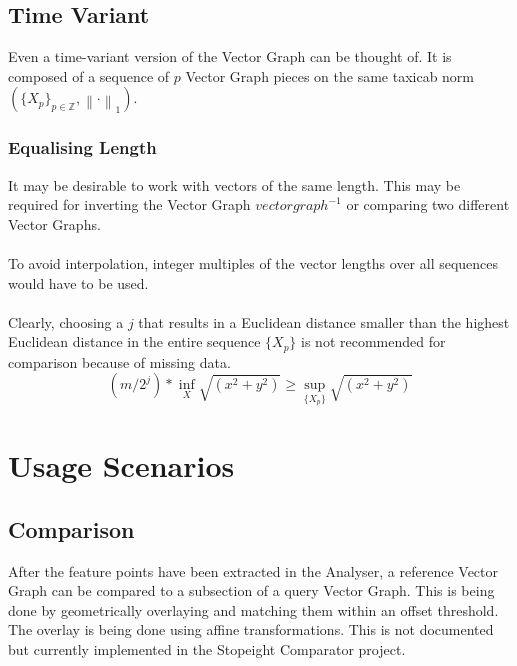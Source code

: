 \documentclass{report}
\newcommand\norm[1]{\left\lVert#1\right\rVert}
\begin{document}
\section{Time Variant}
Even a time-variant version of the Vector Graph can be thought of. It is composed of a sequence of $p$ Vector Graph pieces on the same taxicab norm $(\{X_{p}\}_{p\in \mathbb{Z}},\norm{\cdot}_1)$.
\subsection{Equalising Length}
It may be desirable to work with vectors of the same length. This may be required for inverting the Vector Graph $vectorgraph^{-1}$ or comparing two different Vector Graphs.\\\\
To avoid interpolation, integer multiples of the vector lengths over all sequences would have to be used.\\\\
Clearly, choosing a $j$ that results in a Euclidean distance smaller than the highest Euclidean distance in the entire sequence $\{X_{p}\}$ is not recommended for comparison because of missing data.
\begin{equation}
(m/2^j)*\inf \limits _{X} \sqrt{(x^2+y^2)} \geq \sup \limits _{\{X_{p}\}} \sqrt{(x^2+y^2)}\label{eq:4}
\end{equation}

\chapter{Usage Scenarios}
\section{Comparison}
After the feature points have been extracted in the Analyser, a reference Vector Graph can be compared to a subsection of a query Vector Graph. This is being done by geometrically overlaying and matching them within an offset threshold. The overlay is being done using affine transformations. This is not documented but currently implemented in the Stopeight Comparator project.
\end{document}
